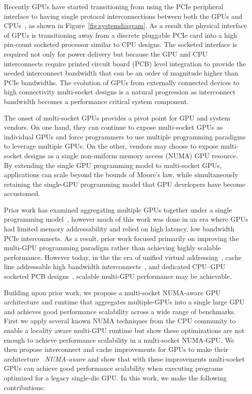 Recently GPUs have started transitioning from using the PCIe peripheral 
interface to having single protocol interconnections between both the GPUs and 
CPUs~\cite{dgx,SierraHPC,AMDINFINITYFABRIC}, as shown in 
Figure~\ref{fig:systemdiagram}. As a result the physical interface of GPUs is 
transitioning away from a discrete pluggable PCIe card into a high pin-count 
socketed processor similar to CPU designs. The socketed interface is required 
not only for power delivery but because the GPU and CPU interconnects require 
printed circuit board (PCB) level integration to provide the needed 
interconnect bandwidth that can be an order of magnitude higher than PCIe 
bandwidths. The evolution of GPUs from externally connected devices to high 
connectivity multi-socket designs is a natural progression as interconnect 
bandwidth becomes a performance critical system component.

The onset of multi-socket GPUs provides a pivot point for GPU and system 
vendors. On one hand, they can continue to expose multi-socket GPUs as 
individual GPUs and force programmers to use multiple programming paradigms to 
leverage multiple GPUs. On the other, vendors may choose to expose multi-socket 
designs as a single non-uniform memory access (NUMA) GPU resource.  By 
extending the single GPU programming model to multi-socket GPUs,  applications 
can scale beyond the bounds of Moore's law, while simultaneously retaining the 
single-GPU programming model that GPU developers have become accustomed.

Prior work has examined aggregating multiple GPUs together under a single
programming model~\cite{lee2013transparent,Cabezas2015}, however much of this 
work
was done in an era where GPUs had limited memory addressability
and relied on high latency, low bandwidth PCIe interconnects.
As a result, prior work focused primarily on improving the multi-GPU programming
paradigm rather than achieving highly scalable performance.
However today, in the the era of unified virtual addressing~\cite{UVM},
cache line addressable high bandwidth interconnects~\cite{NVLINK}, and dedicated 
CPU--GPU
socketed PCB designs~\cite{SierraHPC}, scalable multi-GPU performance
may be achievable.

Building upon prior work, we propose a multi-socket NUMA-aware GPU architecture 
and runtime that aggregates multiple-GPUs into a single large GPU and achieves 
good performance scalability across a wide range of benchmarks.  First we apply 
several known NUMA techniques from the CPU community to enable a locality aware 
multi-GPU runtime but show these optimizations are not enough to achieve 
performance scalability in a multi-socket NUMA-GPU.  We then propose 
interconnect and cache improvements for GPUs to make their architecture 
~\textit{NUMA-aware} and show that with these improvements multi-socket GPUs can 
achieve good performance scalability when executing programs optimized for a 
legacy single-die GPU. In this work, we make the following contributions:

